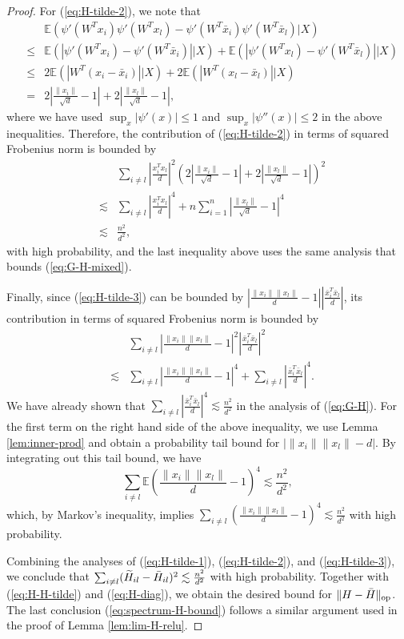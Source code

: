 \begin{proof}
For (\ref{eq:H-tilde-2}), we note that
\begin{eqnarray*}
&& \mathbb{E}\left(\psi'(W^T{x}_i)\psi'(W^T{x}_l)-\psi'(W^T\bar{x}_i)\psi'(W^T\bar{x}_l)\big|X\right) \\
&\leq& \mathbb{E}\left(|\psi'(W^T{x}_i)-\psi'(W^T\bar{x}_i)|\big|X\right) + \mathbb{E}\left(|\psi'(W^T{x}_l)-\psi'(W^T\bar{x}_l)|\big|X\right) \\
&\leq& 2\mathbb{E}\left(|W^T(x_i-\bar{x}_i)|\big|X\right) + 2\mathbb{E}\left(|W^T(x_l-\bar{x}_l)|\big|X\right) \\
&=& 2\left|\frac{\|x_i\|}{\sqrt{d}}-1\right| + 2\left|\frac{\|x_l\|}{\sqrt{d}}-1\right|,
\end{eqnarray*}
where we have used $\sup_x|\psi'(x)|\leq 1$ and $\sup_x|\psi''(x)|\leq 2$ in the above inequalities. Therefore, the contribution of (\ref{eq:H-tilde-2}) in terms of squared Frobenius norm is bounded by
\begin{eqnarray*}
&& \sum_{i\neq l}\left|\frac{x_i^Tx_l}{d}\right|^2\left(2\left|\frac{\|x_i\|}{\sqrt{d}}-1\right| + 2\left|\frac{\|x_l\|}{\sqrt{d}}-1\right|\right)^2 \\
&\lesssim& \sum_{i\neq l}\left|\frac{x_i^Tx_l}{d}\right|^4 + n\sum_{i=1}^n\left|\frac{\|x_l\|}{\sqrt{d}}-1\right|^4 \\
&\lesssim& \frac{n^2}{d^2},
\end{eqnarray*}
with high probability, and the last inequality above uses the same analysis that bounds (\ref{eq:G-H-mixed}).

Finally, since (\ref{eq:H-tilde-3}) can be bounded by $\left|\frac{\|x_i\|\|x_l\|}{d}-1\right|\left|\frac{\bar{x}_i^T\bar{x}_l}{d}\right|$, its contribution in terms of squared Frobenius norm is bounded by
\begin{eqnarray*}
&& \sum_{i\neq l}\left|\frac{\|x_i\|\|x_l\|}{d}-1\right|^2\left|\frac{\bar{x}_i^T\bar{x}_l}{d}\right|^2 \\
&\lesssim& \sum_{i\neq l}\left|\frac{\|x_i\|\|x_l\|}{d}-1\right|^4 + \sum_{i\neq l}\left|\frac{\bar{x}_i^T\bar{x}_l}{d}\right|^4.
\end{eqnarray*}
We have already shown that $\sum_{i\neq l}\left|\frac{\bar{x}_i^T\bar{x}_l}{d}\right|^4\lesssim \frac{n^2}{d^2}$ in the analysis of (\ref{eq:G-H}). For the first term on the right hand side of the above inequality, we use Lemma \ref{lem:inner-prod} and obtain a probability tail bound for $|\|x_i\|\|x_l\|-d|$. By integrating out this tail bound, we have
$$\sum_{i\neq l}\mathbb{E}\left(\frac{\|x_i\|\|x_l\|}{d}-1\right)^4\lesssim \frac{n^2}{d^2},$$
which, by Markov's inequality, implies $\sum_{i\neq l}\left(\frac{\|x_i\|\|x_l\|}{d}-1\right)^4\lesssim \frac{n^2}{d^2}$ with high probability. 

Combining the analyses of (\ref{eq:H-tilde-1}), (\ref{eq:H-tilde-2}), and (\ref{eq:H-tilde-3}), we conclude that $\sum_{i\neq l}(\widetilde{H}_{il}-\bar{H}_{il})^2\lesssim \frac{n^2}{d^2}$ with high probability. Together with (\ref{eq:H-H-tilde}) and (\ref{eq:H-diag}), we obtain the desired bound for $\|H-\bar{H}\|_{\rm op}$.
The last conclusion (\ref{eq:spectrum-H-bound}) follows a similar argument used in the proof of Lemma \ref{lem:lim-H-relu}.
\end{proof}


